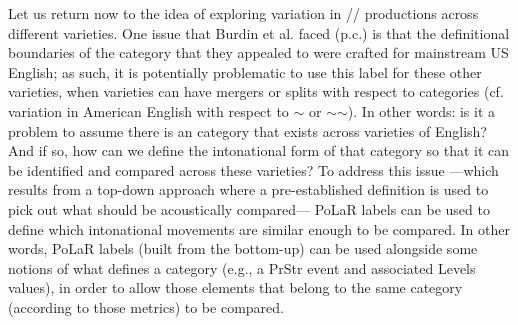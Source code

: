Let us return now to the idea of exploring variation in // productions across different varieties. One issue that Burdin et al. faced (p.c.) is that the definitional boundaries of the  category that they appealed to were crafted for mainstream US English; as such, it is potentially problematic to use this label for these other varieties, when varieties can have mergers or splits with respect to categories (cf. variation in American English with respect to $\sim$ or $\sim$$\sim$). In other words: is it a problem to assume there is an  category that exists across varieties of English? And if so, how can we define the intonational form of that category so that it can be identified and compared across these varieties? To address this issue —which results from a top-down approach where a pre-established definition is used to pick out what should be acoustically compared— PoLaR labels can be used to define which intonational movements are similar enough to be compared. In other words, PoLaR labels (built from the bottom-up) can be used alongside some notions of what defines a category (e.g., a PrStr event and associated Levels values), in order to allow those elements that belong to the same category (according to those metrics) to be compared.



